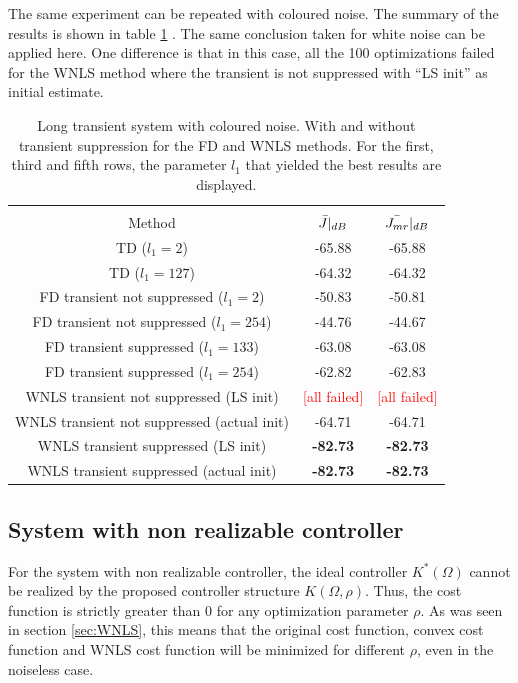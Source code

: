 The same experiment can be repeated with coloured noise. The summary of the results is shown in table \ref{tab:long_transient_coloured_transient_with_without_TD_vs_FD_vs_WNLS}
. The same conclusion taken for white noise can be applied here. One difference is that in this case, all the 100 optimizations failed for the WNLS method where the transient is not suppressed with ``LS init'' as initial estimate.
\begin{table}[H]
\centering
\begin{tabular}{|ccc|}
\hline
&&\\[-2.5ex]
Method & $\Bar{J}|_{dB}$ & $\Bar{J_{mr}}|_{dB}$ \\
\hline
TD ($l_1 = 2$) & -65.88 & -65.88 \\
TD ($l_1 = 127$) & -64.32 & -64.32 \\
FD transient not suppressed ($l_1 = 2$) & -50.83 & -50.81 \\
FD transient not suppressed ($l_1 = 254$) & -44.76 & -44.67 \\
FD transient suppressed ($l_1 = 133$) & -63.08 & -63.08 \\
FD transient suppressed ($l_1 = 254$) & -62.82 & -62.83 \\
WNLS transient not suppressed (LS init) & \textcolor{red}{[all failed]} & \textcolor{red}{[all failed]}   \\
WNLS transient not suppressed (actual init) & -64.71 & -64.71 \\
WNLS transient suppressed (LS init) & \textbf{-82.73} & \textbf{-82.73} \\
WNLS transient suppressed (actual init) & \textbf{-82.73} & \textbf{-82.73} \\
\hline
\end{tabular}
\caption{Long transient system with coloured noise. With and without transient suppression for the FD and WNLS methods. For the first, third and fifth rows, the parameter $l_1$ that yielded the best results are displayed.}
\label{tab:long_transient_coloured_transient_with_without_TD_vs_FD_vs_WNLS}
\end{table}

\newpage
\subsection{System with non realizable controller}
For the system with non realizable controller, the ideal controller $K^*(\Omega)$ cannot be realized by the proposed controller structure $K(\Omega,\rho)$. Thus, the cost function is strictly greater than 0 for any optimization parameter $\rho$. As was seen in section \ref{sec:WNLS}, this means that the original cost function, convex cost function and WNLS cost function will be minimized for different $\rho$, even in the noiseless case.

